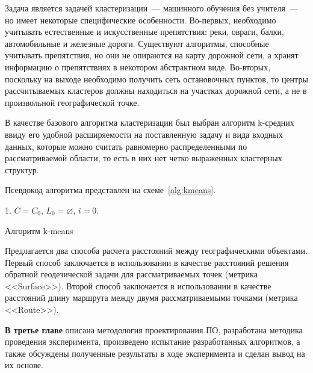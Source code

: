 Задача является задачей кластеризации~--- машинного обучения без учителя~--- но имеет некоторые специфические особенности. Во-первых, необходимо учитывать естественные и искусственные препятствия: реки, овраги, балки, автомобильные и железные дороги. Существуют алгоритмы, способные учитывать препятствия, но они не опираются на карту дорожной сети, а хранят информацию о препятствиях в некотором абстрактном виде. Во-вторых, поскольку на выходе необходимо получить сеть остановочных пунктов, то центры рассчитываемых кластеров должны находиться на участках дорожной сети, а не в произвольной географической точке.

В качестве базового алгоритма кластеризации был выбран алгоритм k-средних ввиду его удобной расширяемости на поставленную задачу и вида входных данных, которые можно считать равномерно распределенными по рассматриваемой области, то есть в них нет четко выраженных кластерных структур.

Псевдокод алгоритма представлен на схеме~\ref{alg:kmeans}.
\begin{algorithm}
    1. \( C = C_0 \), \( L_0 = \varnothing \), \( i = 0\). 
    \caption{Алгоритм k-means}
    \label{alg:kmeans}
\end{algorithm}

Предлагается два способа расчета расстояний между географическими объектами. Первый способ заключается в использовании в качестве расстояний решения обратной геодезической задачи для рассматриваемых точек (метрика <<Surface>>). Второй способ заключается в использовании в качестве расстояний длину маршрута между двумя рассматриваемыми точками (метрика <<Route>>).

\textbf{В третье главе} описана методология проектирования ПО, разработана методика проведения эксперимента, произведено испытание разработанных алгоритмов, а также обсуждены полученные результаты в ходе эксперимента и сделан вывод на их основе.


